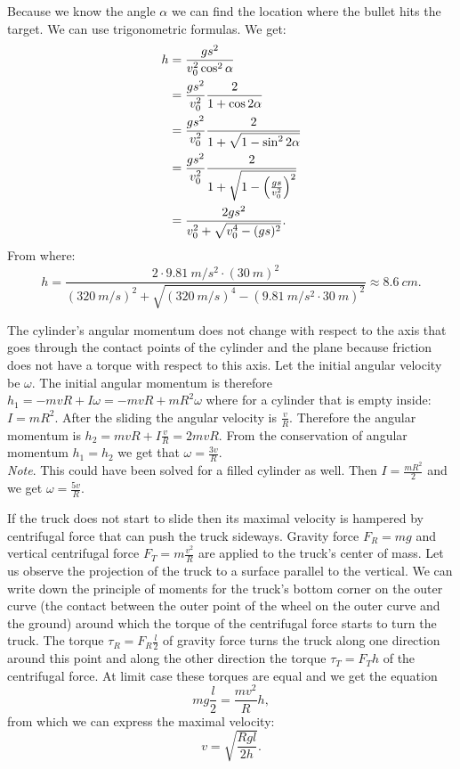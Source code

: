 \documentclass[11pt]{article}
\begin{document}
Because we know the angle $\alpha$ we can find the location where the bullet hits the target. We can use trigonometric formulas. We get:
\begin{align*}
h & = {gs^2 \over v_{0}^2\cos^2\alpha}\\
& = {gs^2 \over v_{0}^2}{2 \over 1+\cos2\alpha}\\
& = {gs^2 \over v_{0}^2}{2 \over 1+\sqrt{1-\sin^2 2\alpha}}\\
& = {gs^2 \over v_{0}^2}{2 \over 1+\sqrt{1-\Big({gs \over v_0^2}\Big)^2}}\\
& = {2gs^2 \over v_0^2+\sqrt{v_0^4-(gs)^2}}.
\end{align*}
From where:
$$
h  = \frac{2\cdot \SI{9,81}{m/s^2} \cdot (\SI{30}{m})^2}{(\SI{320}{m/s})^2+\sqrt{(\SI{320}{m/s})^4-(\SI{9,81}{m/s^2} \cdot \SI{30}{m})^2}} \approx \SI{8,6}{cm}.
$$
\probend
\bigskip


\solueng
The cylinder’s angular momentum does not change with respect to the axis that goes through the contact points of the cylinder and the plane because friction does not have a torque with respect to this axis. Let the initial angular velocity be $\omega$. The initial angular momentum is therefore $h_1=-mvR+I\omega=-mvR+mR^2\omega$ where for a cylinder that is empty inside: $I=mR^2$. After the sliding the angular velocity is $\frac{v}{R}$. Therefore the angular momentum is $h_2=mvR+I\frac{v}{R}=2mvR$. From the conservation of angular momentum $h_1=h_2$ we get that $\omega=\frac{3v}{R}$.\\
\emph{Note}. This could have been solved for a filled cylinder as well. Then $I=\frac{mR^2}{2}$ and we get $\omega = \frac{5v}{R}$.
\probend
\bigskip


\solueng
If the truck does not start to slide then its maximal velocity is hampered by centrifugal force that can push the truck sideways. Gravity force $F_R=mg$ and vertical centrifugal force $F_T=m\frac{v^2}{R}$ are applied to the truck’s center of mass. Let us observe the projection of the truck to a surface parallel to the vertical. We can write down the principle of moments for the truck’s bottom corner on the outer curve (the contact between the outer point of the wheel on the outer curve and the ground) around which the torque of the centrifugal force starts to turn the truck. The torque $\tau_R=F_R\frac{l}{2}$ of gravity force turns the truck along one direction around this point and along the other direction the torque $\tau_T=F_T h$ of the centrifugal force. At limit case these torques are equal and we get the equation
$$mg\frac{l}{2}=\frac{mv^2}{R}h,$$ 
from which we can express the maximal velocity:
$$v=\sqrt{\frac{Rgl}{2h}}.$$
\probend
\bigskip
\end{document}
